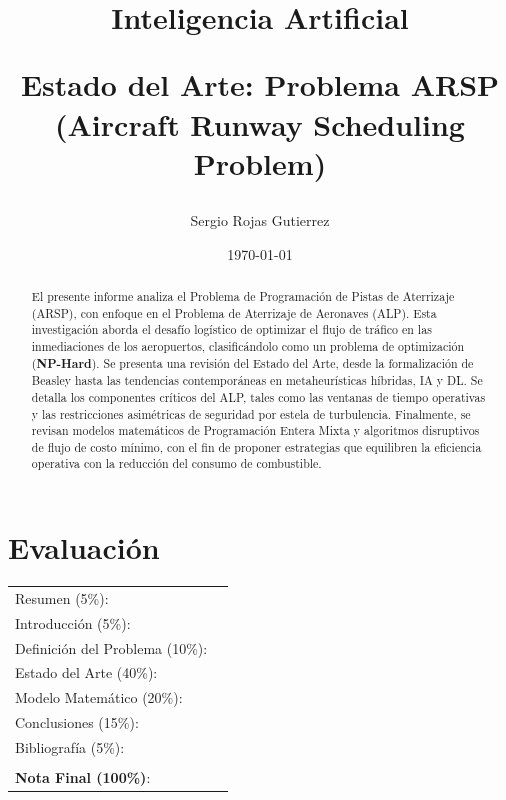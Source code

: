 \documentclass[letter, 10pt]{article}
\begin{document}
\title{Inteligencia Artificial \\ \begin{Large}Estado del Arte: Problema ARSP (Aircraft Runway Scheduling Problem)\end{Large}}
\author{Sergio Rojas Gutierrez}
\date{\today}
\maketitle

\section*{Evaluaci\'on}

\begin{tabular}{ll}
Resumen (5\%): & \underline{\hspace{2cm}} \\
Introducci\'on (5\%):  & \underline{\hspace{2cm}} \\
Definici\'on del Problema (10\%):  & \underline{\hspace{2cm}} \\
Estado del Arte (40\%):  & \underline{\hspace{2cm}} \\
Modelo Matem\'atico (20\%): &  \underline{\hspace{2cm}}\\
Conclusiones (15\%): &  \underline{\hspace{2cm}}\\
Bibliograf\'ia (5\%): & \underline{\hspace{2cm}}\\
 &  \\
\textbf{Nota Final (100\%)}:   & \underline{\hspace{2cm}}
\end{tabular}
\vspace{2cm}


\begin{abstract}
El presente informe analiza el Problema de Programaci\'on de Pistas de Aterrizaje (ARSP), con enfoque en el Problema de Aterrizaje de Aeronaves (ALP). Esta investigaci\'on aborda el desaf\'io log\'istico de optimizar el flujo de tr\'afico en las inmediaciones de los aeropuertos, clasific\'andolo como un problema de optimizaci\'on (\textbf{NP-Hard}). Se presenta una revisi\'on del Estado del Arte, desde la formalizaci\'on de Beasley hasta las tendencias contempor\'aneas en metaheur\'isticas h\'ibridas, IA y DL. Se detalla los componentes cr\'iticos del ALP, tales como las ventanas de tiempo operativas y las restricciones asim\'etricas de seguridad por estela de turbulencia. Finalmente, se revisan modelos matem\'aticos de Programaci\'on Entera Mixta y algoritmos disruptivos de flujo de costo m\'inimo, con el fin de proponer estrategias que equilibren la eficiencia operativa con la reducci\'on del consumo de combustible.
\end{abstract}
\newpage
\end{document}

